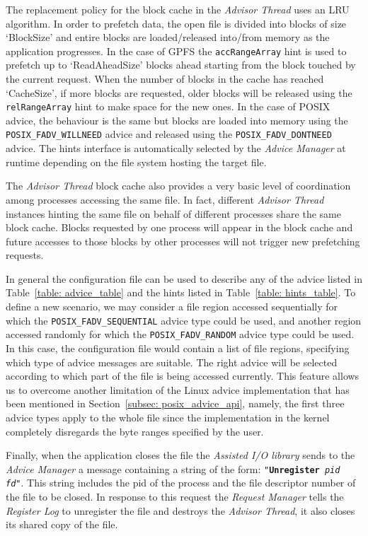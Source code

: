The replacement policy for the block cache in the \textit{Advisor Thread} uses an LRU algorithm. In order to prefetch data, the open file is divided into blocks of size `BlockSize' and entire blocks are loaded/released into/from memory as the application 
progresses. In the case of GPFS the \texttt{accRangeArray} hint is used to prefetch up to `ReadAheadSize' blocks ahead starting from the block touched by the current request. When the number of blocks in the cache has reached `CacheSize', if more blocks are 
requested, older blocks will be released using the \texttt{relRangeArray} hint to make space for the new ones. In the case of POSIX advice, the behaviour is the same but blocks are loaded into memory using the \texttt{POSIX\_FADV\_WILLNEED} advice and released 
using the \texttt{POSIX\_FADV\_DONTNEED} advice. The hints interface is automatically selected by the \textit{Advice Manager} at runtime depending on the file system hosting the target file. 

The \textit{Advisor Thread} block cache also provides a very basic level of coordination among processes accessing the same file. In fact, different \textit{Advisor Thread} instances hinting the same file on behalf of different processes share the same block cache. 
Blocks requested by one process will appear in the block cache and future accesses to those blocks by other processes will not trigger new prefetching requests.

In general the configuration file can be used to describe any of the advice listed in Table~\ref{table: advice_table} and the hints listed in Table~\ref{table: hints_table}. To define a new scenario, we may consider a file region accessed sequentially for which 
the \texttt{POSIX\_FADV\_SEQUENTIAL} advice type could be used, and another region accessed randomly for which the \texttt{POSIX\_FADV\_RANDOM} advice type could be used. In this case, the configuration file would contain a list of file regions, specifying which 
type of advice messages are suitable. The right advice will be selected according to which part of the file is being accessed currently. This feature allows us to overcome another limitation of the Linux advice implementation that has been mentioned in 
Section~\ref{subsec: posix_advice_api}, namely, the first three advice types apply to the whole file since the implementation in the kernel completely disregards the byte ranges specified by the user.
 
Finally, when the application closes the file the \textit{Assisted I/O library} sends to the \textit{Advice Manager} a message containing a string of the form: \texttt{"\textbf{Unregister} \textit{pid} \textit{fd}"}. This string includes the pid of the process 
and the file descriptor number of the file to be closed. In response to this request the \textit{Request Manager} tells the \textit{Register Log} to unregister the file and destroys the \textit{Advisor Thread}, it also closes its shared copy of the file.


